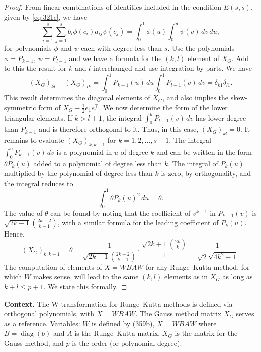 \begin{proof}
From linear combinations of identities included in the condition $E(s, s)$, given by \eqref{eq:321c}, we have
\[
\sum_{i=1}^{s} \sum_{j=1}^{s} b_i \phi(c_i) a_{ij} \psi(c_j) = \int_0^1 \phi(u) \int_0^u \psi(v) \, dv \, du,
\]
for polynomials $\phi$ and $\psi$ each with degree less than $s$. Use the polynomials $\phi = P_{k-1}$, $\psi = P_{l-1}$ and we have a formula for the $(k, l)$ element of $X_G$. Add to this the result for $k$ and $l$ interchanged and use integration by parts. We have
\[
(X_G)_{kl} + (X_G)_{lk} = \int_0^1 P_{k-1}(u) \, du \int_0^1 P_{l-1}(v) \, dv = \delta_{k1} \delta_{l1}.
\]
This result determines the diagonal elements of $X_G$, and also implies the skew-symmetric form of $X_G - \frac{1}{2} e_1 e_1^\top$. We now determine the form of the lower triangular elements. If $k > l + 1$, the integral $\int_0^u P_{l-1}(v) \, dv$ has lower degree than $P_{k-1}$ and is therefore orthogonal to it. Thus, in this case, $(X_G)_{kl} = 0$. It remains to evaluate $(X_G)_{k,k-1}$ for $k = 1, 2, \dots, s-1$. The integral $\int_0^u P_{k-1}(v) \, dv$ is a polynomial in $u$ of degree $k$ and can be written in the form $\theta P_k(u)$ added to a polynomial of degree less than $k$. The integral of $P_k(u)$ multiplied by the polynomial of degree less than $k$ is zero, by orthogonality, and the integral reduces to
\[
\int_0^1 \theta P_k(u)^2 \, du = \theta.
\]
The value of $\theta$ can be found by noting that the coefficient of $v^{k-1}$ in $P_{k-1}(v)$ is $\sqrt{2k-1} \binom{2k-2}{k-1}$, with a similar formula for the leading coefficient of $P_k(u)$. Hence,
\[
(X_G)_{k,k-1} = \theta = \frac{1}{\sqrt{2k-1} \binom{2k-2}{k-1}} \cdot \frac{\sqrt{2k+1} \binom{2k}{k}}{1} = \frac{1}{\sqrt{2} \sqrt{4k^2 - 1}}.
\]
The computation of elements of $X = W BAW$ for any Runge--Kutta method, for which $W$ makes sense, will lead to the same $(k, l)$ elements as in $X_G$ as long as $k + l \leq p + 1$. We state this formally.
\end{proof}

\noindent\textbf{Context.}
The W transformation for Runge--Kutta methods is defined via orthogonal polynomials, with $X = W BAW$. The Gauss method matrix $X_G$ serves as a reference. Variables: $W$ is defined by (359b), $X = W BAW$ where $B=\operatorname{diag}(b)$ and $A$ is the Runge--Kutta matrix, $X_G$ is the matrix for the Gauss method, and $p$ is the order (or polynomial degree).

